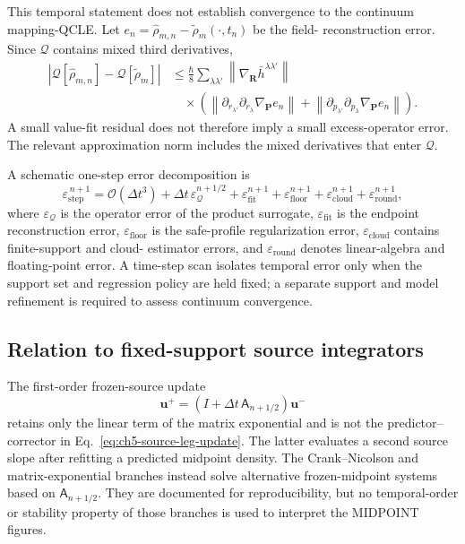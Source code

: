 \documentclass[
  11pt,
  letterpaper,
  onehalfspacing,
  normalmargins,
  equalmargins,
  oneside
]{ut-thesis}
\begin{document}
This temporal statement does not establish convergence to the continuum
mapping-QCLE. Let
\(e_n=\widehat{\rho}_{m,n}-\tilde\rho_m(\cdot,t_n)\) be the field-
reconstruction error. Since \(\mathcal Q\) contains mixed third derivatives,
\begin{align}
\left|
\mathcal Q[\widehat{\rho}_{m,n}]
-
\mathcal Q[\tilde\rho_m]
\right|
&\leq
\frac{\hbar}{8}
\sum_{\lambda\lambda'}
\left\|
\nabla_{\mathbf R}\bar h^{\lambda\lambda'}
\right\|
\nonumber\\
&\quad\times
\left(
\left\|
\partial_{r_{\lambda'}}\partial_{r_\lambda}
\nabla_{\mathbf P}e_n
\right\|
+
\left\|
\partial_{p_{\lambda'}}\partial_{p_\lambda}
\nabla_{\mathbf P}e_n
\right\|
\right).
\label{eq:ch5-operator-error-bound}
\end{align}
A small value-fit residual does not therefore imply a small excess-operator
error. The relevant approximation norm includes the mixed derivatives that
enter \(\mathcal Q\).

A schematic one-step error decomposition is
\begin{equation}
\varepsilon_{\mathrm{step}}^{\,n+1}
=
\mathcal O(\Delta t^3)
+
\Delta t\,\varepsilon_{\mathcal Q}^{n+1/2}
+
\varepsilon_{\mathrm{fit}}^{n+1}
+
\varepsilon_{\mathrm{floor}}^{n+1}
+
\varepsilon_{\mathrm{cloud}}^{n+1}
+
\varepsilon_{\mathrm{round}}^{n+1},
\label{eq:ch5-error-decomposition}
\end{equation}
where \(\varepsilon_{\mathcal Q}\) is the operator error of the product
surrogate, \(\varepsilon_{\mathrm{fit}}\) is the endpoint reconstruction
error, \(\varepsilon_{\mathrm{floor}}\) is the safe-profile regularization
error, \(\varepsilon_{\mathrm{cloud}}\) contains finite-support and cloud-
estimator errors, and \(\varepsilon_{\mathrm{round}}\) denotes linear-algebra
and floating-point error. A time-step scan isolates temporal error only when
the support set and regression policy are held fixed; a separate support and
model refinement is required to assess continuum convergence.

\subsection{Relation to fixed-support source integrators}
\label{subsec:ch5-dyson-comparator}

The first-order frozen-source update
\begin{equation}
\mathbf u^+
=
\left(I+\Delta t\,\mathsf A_{n+1/2}\right)\mathbf u^-
\label{eq:ch5-dyson-source-approximation}
\end{equation}
retains only the linear term of the matrix exponential and is not the
predictor--corrector in Eq.~\eqref{eq:ch5-source-leg-update}. The latter
evaluates a second source slope after refitting a predicted midpoint density.
The Crank--Nicolson and matrix-exponential branches instead solve alternative
frozen-midpoint systems based on \(\mathsf A_{n+1/2}\). They are documented
for reproducibility, but no temporal-order or stability property of those
branches is used to interpret the MIDPOINT figures.
\end{document}
